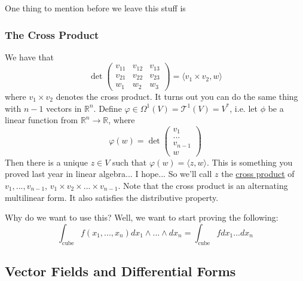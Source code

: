 \documentclass{article}
\newcommand{\reals}[0]{\mathbb{R}}
\newcommand{\mc}[1]{\mathcal{#1}}
\begin{document}
One thing to mention before we leave this stuff is
\subsubsection{The Cross Product}
We have that
\begin{equation}
  \det\begin{pmatrix}
    v_{11} & v_{12} & v_{13} \\
    v_{21} & v_{22} & v_{23} \\
    w_{1} & w_{2} & w_{3}
  \end{pmatrix} = \langle v_1 \times v_2, w \rangle
\end{equation}
where \(v_1 \times v_2\) denotes the cross product. It turns out you can do the same thing with \(n - 1\) vectors in \(\reals^n\). Define \(\varphi \in \Omega^1(V) = \mc{T}^1(V) = V^*\), i.e. let \(\phi\) be a linear function from \(\reals^n \to \reals\), where
\begin{equation}
  \varphi(w) = \det\begin{pmatrix} v_1 \\ ... \\ v_{n - 1} \\ w \end{pmatrix}
\end{equation}
Then there is a unique \(z \in V\) such that \(\varphi(w) = \langle z, w \rangle\). This is something you proved last year in linear algebra... I hope...
So we'll call \(z\) the \underline{cross product} of \(v_1,...,v_{n - 1}\), \(v_1 \times v_2 \times ... \times v_{n - 1}\).
Note that the cross product is an alternating multilinear form. It also satisfies the distributive property.

Why do we want to use this? Well, we want to start proving the following:
\begin{equation}
  \int_{\text{cube}}f(x_1,...,x_n)dx_1 \wedge ... \wedge dx_n = \int_{\text{cube}}f dx_1...dx_n
\end{equation}


\subsection{Vector Fields and Differential Forms}
\end{document}
